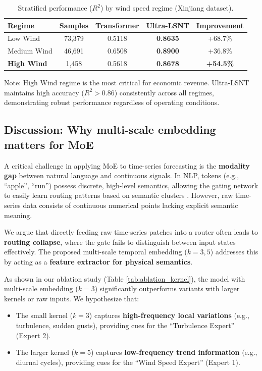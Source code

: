 \documentclass[review,3p,times,draft]{elsarticle}
\begin{document}
\begin{table}[htbp]
\centering
\caption{Stratified performance ($R^2$) by wind speed regime (Xinjiang dataset).}
\label{tab:stratified}
\begin{tabular}{@{}lcccc@{}}
\toprule
\textbf{Regime} & \textbf{Samples} & \textbf{Transformer} & \textbf{Ultra-LSNT} & \textbf{Improvement} \\
\midrule
Low Wind & 73,379 & 0.5118 & \textbf{0.8635} & +68.7\% \\
Medium Wind & 46,691 & 0.6508 & \textbf{0.8900} & +36.8\% \\
\textbf{High Wind} & 1,458 & 0.5618 & \textbf{0.8678} & \textbf{+54.5\%} \\
\bottomrule
\end{tabular}
\begin{tablenotes}
\small
\item Note: High Wind regime is the most critical for economic revenue. Ultra-LSNT maintains high accuracy ($R^2>0.86$) consistently across all regimes, demonstrating robust performance regardless of operating conditions.
\end{tablenotes}
\end{table}

\subsection{Discussion: Why multi-scale embedding matters for MoE}
\label{sec:discussion_embedding}

A critical challenge in applying MoE to time-series forecasting is the \textbf{modality gap} between natural language and continuous signals. In NLP, tokens (e.g., ``apple'', ``run'') possess discrete, high-level semantics, allowing the gating network to easily learn routing patterns based on semantic clusters \cite{shazeer2017outrageously}. However, raw time-series data consists of continuous numerical points lacking explicit semantic meaning. 

We argue that directly feeding raw time-series patches into a router often leads to \textbf{routing collapse}, where the gate fails to distinguish between input states effectively. The proposed multi-scale temporal embedding ($k=3, 5$) addresses this by acting as a \textbf{feature extractor for physical semantics}. 

As shown in our ablation study (Table \ref{tab:ablation_kernel}), the model with multi-scale embedding ($k=3$) significantly outperforms variants with larger kernels or raw inputs. We hypothesize that:
\begin{itemize}
    \item The small kernel ($k=3$) captures \textbf{high-frequency local variations} (e.g., turbulence, sudden gusts), providing cues for the ``Turbulence Expert'' (Expert 2).
    \item The larger kernel ($k=5$) captures \textbf{low-frequency trend information} (e.g., diurnal cycles), providing cues for the ``Wind Speed Expert'' (Expert 1).
\end{itemize}
\end{document}
